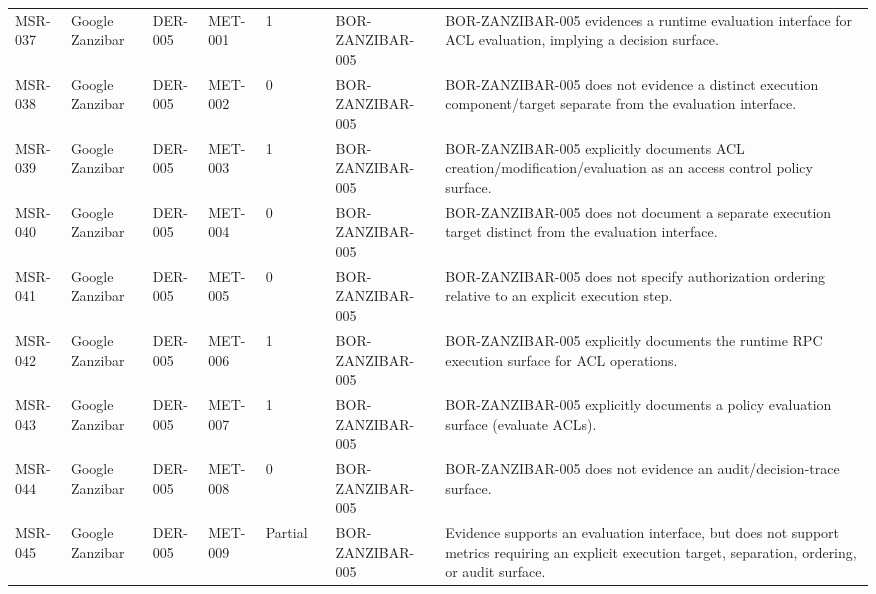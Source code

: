 \documentclass{article}
\begin{document}
\begin{longtable}{@{}p{}p{}p{}p{}p{}p{}p{}p{}@{}}
MSR-037 & Google Zanzibar & DER-005 & MET-001 & 1 &  & BOR-ZANZIBAR-005 & BOR-ZANZIBAR-005 evidences a runtime evaluation interface for ACL evaluation, implying a decision surface.\\
MSR-038 & Google Zanzibar & DER-005 & MET-002 & 0 &  & BOR-ZANZIBAR-005 & BOR-ZANZIBAR-005 does not evidence a distinct execution component/target separate from the evaluation interface.\\
MSR-039 & Google Zanzibar & DER-005 & MET-003 & 1 &  & BOR-ZANZIBAR-005 & BOR-ZANZIBAR-005 explicitly documents ACL creation/modification/evaluation as an access control policy surface.\\
MSR-040 & Google Zanzibar & DER-005 & MET-004 & 0 &  & BOR-ZANZIBAR-005 & BOR-ZANZIBAR-005 does not document a separate execution target distinct from the evaluation interface.\\
MSR-041 & Google Zanzibar & DER-005 & MET-005 & 0 &  & BOR-ZANZIBAR-005 & BOR-ZANZIBAR-005 does not specify authorization ordering relative to an explicit execution step.\\
MSR-042 & Google Zanzibar & DER-005 & MET-006 & 1 &  & BOR-ZANZIBAR-005 & BOR-ZANZIBAR-005 explicitly documents the runtime RPC execution surface for ACL operations.\\
MSR-043 & Google Zanzibar & DER-005 & MET-007 & 1 &  & BOR-ZANZIBAR-005 & BOR-ZANZIBAR-005 explicitly documents a policy evaluation surface (evaluate ACLs).\\
MSR-044 & Google Zanzibar & DER-005 & MET-008 & 0 &  & BOR-ZANZIBAR-005 & BOR-ZANZIBAR-005 does not evidence an audit/decision-trace surface.\\
MSR-045 & Google Zanzibar & DER-005 & MET-009 & Partial &  & BOR-ZANZIBAR-005 & Evidence supports an evaluation interface, but does not support metrics requiring an explicit execution target, separation, ordering, or audit surface.\\


\end{longtable}
\end{document}
